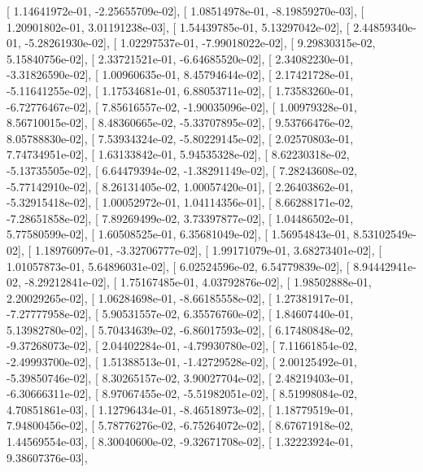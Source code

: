 \documentclass{article}
\begin{document}
       [  1.14641972e-01,  -2.25655709e-02],
       [  1.08514978e-01,  -8.19859270e-03],
       [  1.20901802e-01,   3.01191238e-03],
       [  1.54439785e-01,   5.13297042e-02],
       [  2.44859340e-01,  -5.28261930e-02],
       [  1.02297537e-01,  -7.99018022e-02],
       [  9.29830315e-02,   5.15840756e-02],
       [  2.33721521e-01,  -6.64685520e-02],
       [  2.34082230e-01,  -3.31826590e-02],
       [  1.00960635e-01,   8.45794644e-02],
       [  2.17421728e-01,  -5.11641255e-02],
       [  1.17534681e-01,   6.88053711e-02],
       [  1.73583260e-01,  -6.72776467e-02],
       [  7.85616557e-02,  -1.90035096e-02],
       [  1.00979328e-01,   8.56710015e-02],
       [  8.48360665e-02,  -5.33707895e-02],
       [  9.53766476e-02,   8.05788830e-02],
       [  7.53934324e-02,  -5.80229145e-02],
       [  2.02570803e-01,   7.74734951e-02],
       [  1.63133842e-01,   5.94535328e-02],
       [  8.62230318e-02,  -5.13735505e-02],
       [  6.64479394e-02,  -1.38291149e-02],
       [  7.28243608e-02,  -5.77142910e-02],
       [  8.26131405e-02,   1.00057420e-01],
       [  2.26403862e-01,  -5.32915418e-02],
       [  1.00052972e-01,   1.04114356e-01],
       [  8.66288171e-02,  -7.28651858e-02],
       [  7.89269499e-02,   3.73397877e-02],
       [  1.04486502e-01,   5.77580599e-02],
       [  1.60508525e-01,   6.35681049e-02],
       [  1.56954843e-01,   8.53102549e-02],
       [  1.18976097e-01,  -3.32706777e-02],
       [  1.99171079e-01,   3.68273401e-02],
       [  1.01057873e-01,   5.64896031e-02],
       [  6.02524596e-02,   6.54779839e-02],
       [  8.94442941e-02,  -8.29212841e-02],
       [  1.75167485e-01,   4.03792876e-02],
       [  1.98502888e-01,   2.20029265e-02],
       [  1.06284698e-01,  -8.66185558e-02],
       [  1.27381917e-01,  -7.27777958e-02],
       [  5.90531557e-02,   6.35576760e-02],
       [  1.84607440e-01,   5.13982780e-02],
       [  5.70434639e-02,  -6.86017593e-02],
       [  6.17480848e-02,  -9.37268073e-02],
       [  2.04402284e-01,  -4.79930780e-02],
       [  7.11661854e-02,  -2.49993700e-02],
       [  1.51388513e-01,  -1.42729528e-02],
       [  2.00125492e-01,  -5.39850746e-02],
       [  8.30265157e-02,   3.90027704e-02],
       [  2.48219403e-01,  -6.30666311e-02],
       [  8.97067455e-02,  -5.51982051e-02],
       [  8.51998084e-02,   4.70851861e-03],
       [  1.12796434e-01,  -8.46518973e-02],
       [  1.18779519e-01,   7.94800456e-02],
       [  5.78776276e-02,  -6.75264072e-02],
       [  8.67671918e-02,   1.44569554e-03],
       [  8.30040600e-02,  -9.32671708e-02],
       [  1.32223924e-01,   9.38607376e-03],
\end{document}
